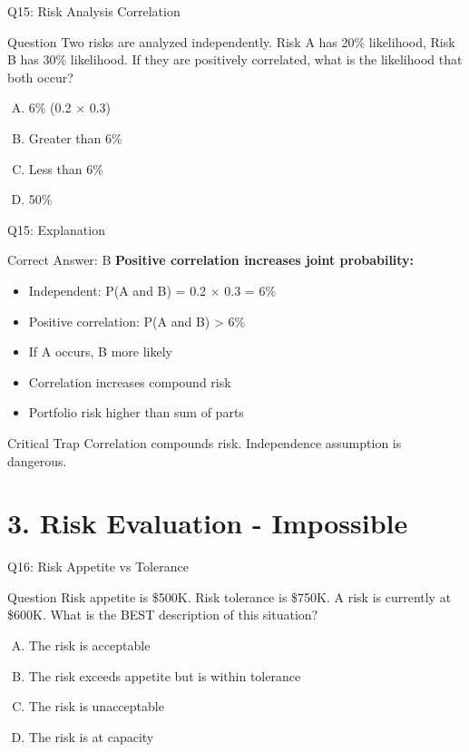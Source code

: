 \documentclass{beamer}
\begin{document}
			\begin{frame}{Q15: Risk Analysis Correlation}
				\begin{block}{Question}
					Two risks are analyzed independently. Risk A has 20\% likelihood, Risk B has 30\% likelihood. If they are positively correlated, what is the likelihood that both occur?
				\end{block}
				\begin{enumerate}[(A)]
					\item 6\% (0.2 $\times$ 0.3)
					\item Greater than 6\%
					\item Less than 6\%
					\item 50\%
				\end{enumerate}
			\end{frame}
			
			\begin{frame}{Q15: Explanation}
				\begin{block}{Correct Answer: B}
					\textbf{Positive correlation increases joint probability:}
					\begin{itemize}
						\item Independent: P(A and B) = 0.2 $\times$ 0.3 = 6\%
						\item Positive correlation: P(A and B) > 6\%
						\item If A occurs, B more likely
						\item Correlation increases compound risk
						\item Portfolio risk higher than sum of parts
					\end{itemize}
				\end{block}
				\begin{alertblock}{Critical Trap}
					Correlation compounds risk. Independence assumption is dangerous.
				\end{alertblock}
			\end{frame}
			
			\section{3. Risk Evaluation - Impossible}
			\begin{frame}{Q16: Risk Appetite vs Tolerance}
				\begin{block}{Question}
					Risk appetite is \$500K. Risk tolerance is \$750K. A risk is currently at \$600K. What is the BEST description of this situation?
				\end{block}
				\begin{enumerate}[(A)]
					\item The risk is acceptable
					\item The risk exceeds appetite but is within tolerance
					\item The risk is unacceptable
					\item The risk is at capacity
				\end{enumerate}
			\end{frame}
			
\end{document}

